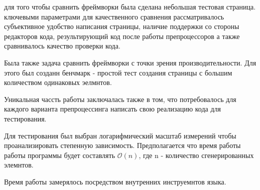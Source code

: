 

для того чтобы сравнить фреймворки была сделана небольшая тестовая страница. ключевыми параметрами для качественного сравнения рассматривалось субъективное удобство написания страницы, наличие поддержки со стороны редакторов кода, результирующий код после работы препроцессоров а также сравнивалось качество проверки кода.

Была также задача сравнить фреймворки с точки зрения производительности. Для этого был созданн бенчмарк - простой тест создания страницы с большим количеством одинаковых эелмнтов.

Уникальная чассть работы заключалась также в том, что потребовалось для каждого варианта препроцессинга написать свою реализацию кода для тестирования.




Для тестирования был выбран логарифмический масштаб измерений чтобы проанализировать степенную зависимость. Предполагается что время работы работы программы будет составлять $\mathcal{O}(n)$, где n - количество сгенерированных элемнтов.

Время работы замерялось посредством внутренних инструемнтов языка. 







